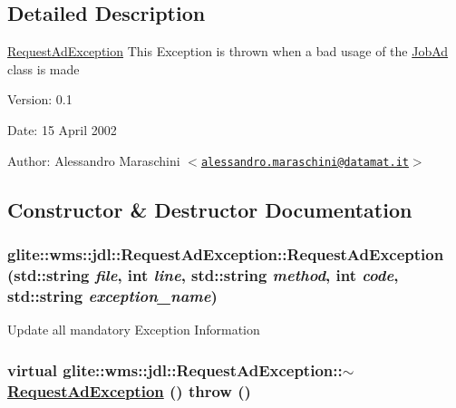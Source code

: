 \subsection{Detailed Description}
\hyperlink{classglite_1_1wms_1_1jdl_1_1RequestAdException}{Request\-Ad\-Exception} This Exception is thrown when a bad usage of the \hyperlink{classglite_1_1wms_1_1jdl_1_1JobAd}{Job\-Ad} class is made \begin{Desc}
\item[Version:]0.1 \end{Desc}
\begin{Desc}
\item[Date:]15 April 2002 \end{Desc}
\begin{Desc}
\item[Author:]Alessandro Maraschini $<$\href{mailto:alessandro.maraschini@datamat.it}{\tt alessandro.maraschini@datamat.it}$>$ \end{Desc}




\subsection{Constructor \& Destructor Documentation}
\hypertarget{classglite_1_1wms_1_1jdl_1_1RequestAdException_b0}{
\subsubsection[RequestAdException]{\setlength{\rightskip}{0pt plus 5cm}glite::wms::jdl::Request\-Ad\-Exception::Request\-Ad\-Exception (std::string {\em file}, int {\em line}, std::string {\em method}, int {\em code}, std::string {\em exception\_\-name})}}
\label{classglite_1_1wms_1_1jdl_1_1RequestAdException_b0}


Update all mandatory Exception Information \hypertarget{classglite_1_1wms_1_1jdl_1_1RequestAdException_b1}{
\subsubsection[$\sim$RequestAdException]{\setlength{\rightskip}{0pt plus 5cm}virtual glite::wms::jdl::Request\-Ad\-Exception::$\sim$\hyperlink{classglite_1_1wms_1_1jdl_1_1RequestAdException}{Request\-Ad\-Exception} ()  throw ()}}
\label{classglite_1_1wms_1_1jdl_1_1RequestAdException_b1}




